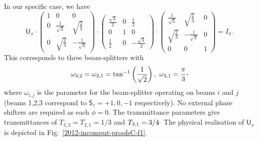 \documentclass[%
 preprint,
 showpacs,
 showkeys,
 amsmath,
 amssymb,
 aps,
 pra,
 ]{revtex4-1}
\theoremstyle{definition}
\begin{document}
In our specific case, we have
\begin{equation}
	\textsf{U}_x \cdot
	\begin{pmatrix}
	1 & 0 & 0\\
	0 & \frac{1}{\sqrt{3}} & \sqrt{\frac{2}{3}}\\
	0 & \sqrt{\frac{2}{3}} & -\frac{1}{\sqrt{3}}
	\end{pmatrix}
	\cdot
	\begin{pmatrix}
	\frac{\sqrt{3}}{2} & 0 & \frac{1}{2}\\
	0 & 1 & 0\\
	\frac{1}{2} & 0 & -\frac{\sqrt{3}}{2}
	\end{pmatrix}
	\cdot
	\begin{pmatrix}
	\frac{1}{\sqrt{3}} & \sqrt{\frac{2}{3}} & 0\\
	\sqrt{\frac{2}{3}} & -\frac{1}{\sqrt{3}} & 0\\
	0 & 0 & 1
	\end{pmatrix}
	=I_3.
\end{equation}
This corresponds to three beam-splitters with $$\omega_{3,2}=\omega_{2,1}=\tan^{-1}\left(\frac{1}{\sqrt{2}}\right),\ \omega_{3,1}=\frac{\pi}{3}\raisebox{.8mm}{,}$$
where $\omega_{i,j}$ is the parameter for the beam-splitter operating on beams $i$ and $j$ (beams 1,2,3 correspond to $\textsf{S}_z=+1,0,-1$ respectively). No external phase shifters are required as each $\phi=0$.
The transmittance parameters give transmittances of $T_{3,2}=T_{2,1}=1/3$ and $T_{3,1}=3/4\raisebox{.8mm}{.}$
The physical realisation of $\textsf{U}_x$ is depicted in Fig.~\ref{2012-incomput-proofsC-f1}.
\end{document}
